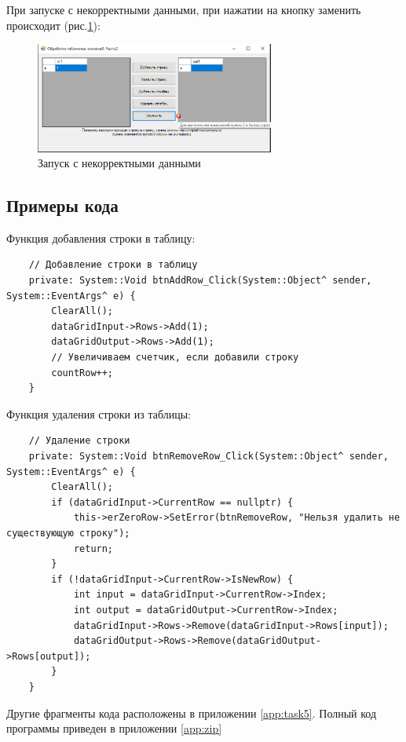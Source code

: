 При запуске с некорректными данными, при нажатии на кнопку заменить происходит  (рис.\ref{fig:BadInputNotIntForm5}):

\begin{figure}[!h]
    \centering
    \includegraphics[width = 0.7\textwidth]{images/Task5/Try1RowChange.png}
    \caption{Запуск с некорректными данными}
    \label{fig:BadInputNotIntForm5}
\end{figure}

\subsection{Примеры кода}

Функция добавления строки в таблицу:

\begin{verbatim}
	// Добавление строки в таблицу
	private: System::Void btnAddRow_Click(System::Object^ sender, System::EventArgs^ e) {
		ClearAll();
		dataGridInput->Rows->Add(1);
		dataGridOutput->Rows->Add(1);
		// Увеличиваем счетчик, если добавили строку
		countRow++;
	}
\end{verbatim}

Функция удаления строки из таблицы:

\begin{verbatim}
	// Удаление строки
	private: System::Void btnRemoveRow_Click(System::Object^ sender, System::EventArgs^ e) {
		ClearAll();
		if (dataGridInput->CurrentRow == nullptr) {
			this->erZeroRow->SetError(btnRemoveRow, "Нельзя удалить не существующую строку");
			return;
		}
		if (!dataGridInput->CurrentRow->IsNewRow) {
			int input = dataGridInput->CurrentRow->Index;
			int output = dataGridOutput->CurrentRow->Index;
			dataGridInput->Rows->Remove(dataGridInput->Rows[input]);
			dataGridOutput->Rows->Remove(dataGridOutput->Rows[output]);
		}
	}
\end{verbatim}

Другие фрагменты кода расположены в приложении \ref{app:task5}. Полный код программы приведен в приложении \ref{app:zip}
